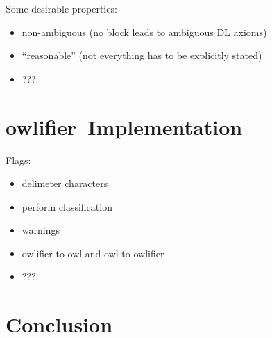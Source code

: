 \documentclass[preprint,number]{elsarticle}
\newcommand{\owlifier}{\textsf{owlifier}}
\begin{document}
Some desirable properties: 
\begin{itemize}
\item non-ambiguous (no block leads to ambiguous DL axioms)
\item ``reasonable'' (not everything has to be explicitly stated)
\item ???
\end{itemize}

\section{\owlifier\ Implementation}
\label{sec:implementation}

Flags: 
\begin{itemize}
\item delimeter characters 
\item perform classification
\item warnings
\item owlifier to owl and owl to owlifier
\item ??? 
\end{itemize}


\section{Conclusion}
\label{sec:conclusion}



%


\end{document}
